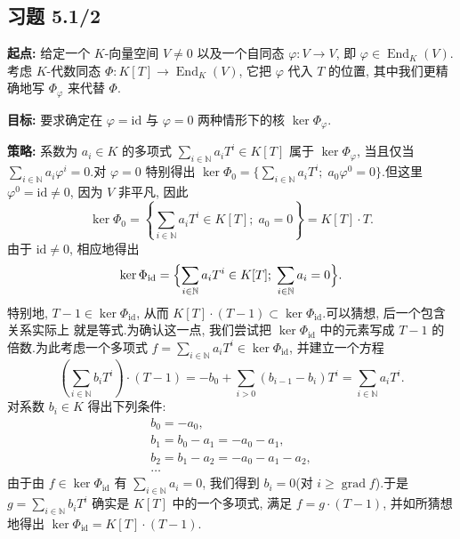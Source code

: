 \subsection*{习题 5.1/2}

\noindent\textbf{起点:} 给定一个 $K$-向量空间 $V \neq 0$ 以及一个自同态
$\varphi \colon V \longrightarrow V$, 即 $\varphi \in \operatorname{End}_K(V)$.考虑
$K$-代数同态 $\Phi \colon K[T] \longrightarrow \operatorname{End}_K(V)$, 它把
$\varphi$ 代入 $T$ 的位置, 其中我们更精确地写 $\Phi_\varphi$ 来代替 $\Phi$.

\noindent\textbf{目标:} 要求确定在 $\varphi = \mathrm{id}$ 与 $\varphi = 0$ 两种情形下的核
$\ker \Phi_\varphi$.

\noindent\textbf{策略:} 系数为 $a_i \in K$ 的多项式
$\sum_{i \in \mathbb{N}} a_i T^i \in K[T]$ 属于 $\ker \Phi_\varphi$, 当且仅当
$\sum_{i \in \mathbb{N}} a_i \varphi^i = 0$.对 $\varphi = 0$ 特别得出
$\ker \Phi_0 = \{ \sum_{i \in \mathbb{N}} a_i T^i;\; a_0 \varphi^0 = 0 \}$.但这里
$\varphi^0 = \mathrm{id} \neq 0$, 因为 $V$ 非平凡, 因此
\[
\ker \Phi_0 = \left\{ \sum_{i \in \mathbb{N}} a_i T^i \in K[T];\; a_0 = 0 \right\} = K[T] \cdot T\text{.}
\]
由于 $\mathrm{id} \neq 0$, 相应地得出
\[
\ker \Phi_{\mathrm{id}} = \Bigl\{ \sum_{i \in \mathbb{N}} a_i T^i \in K[T];\; \sum_{i \in \mathbb{N}} a_i = 0 \Bigr\}\text{.}
\]
特别地, $T - 1 \in \ker \Phi_{\mathrm{id}}$, 从而
$K[T] \cdot (T - 1) \subset \ker \Phi_{\mathrm{id}}$.可以猜想, 后一个包含关系实际上
就是等式.为确认这一点, 我们尝试把 $\ker \Phi_{\mathrm{id}}$ 中的元素写成 $T - 1$ 的
倍数.为此考虑一个多项式 $f = \sum_{i \in \mathbb{N}} a_i T^i \in \ker
\Phi_{\mathrm{id}}$, 并建立一个方程
\[
\left( \sum_{i \in \mathbb{N}} b_i T^i \right) \cdot (T - 1) = -b_0 + \sum_{i > 0} (b_{i - 1} - b_i) T^i = \sum_{i \in \mathbb{N}} a_i T^i\text{.}
\]
对系数 $b_i \in K$ 得出下列条件:
\[
\begin{array}{l}
b_0 = -a_0, \\
b_1 = b_0 - a_1 = -a_0 - a_1, \\
b_2 = b_1 - a_2 = -a_0 - a_1 - a_2, \\
\dots
\end{array}
\]
由于由 $f \in \ker \Phi_{\mathrm{id}}$ 有 $\sum_{i \in \mathbb{N}} a_i = 0$, 我们得到
$b_i = 0$(对 $i \geq \operatorname{grad} f$).于是 $g = \sum_{i \in \mathbb{N}} b_i T^i$
确实是 $K[T]$ 中的一个多项式, 满足 $f = g \cdot (T - 1)$, 并如所猜想地得出
$\ker \Phi_{\mathrm{id}} = K[T] \cdot (T - 1)$.


